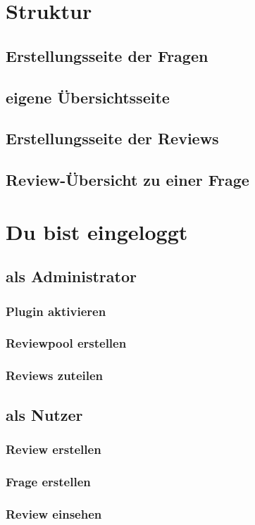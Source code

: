 \documentclass[12pt,a4paper]{scrreprt}
\begin{document}
\chapter{Struktur}
\section{Erstellungsseite der Fragen}
\section{eigene \"Ubersichtsseite}	
\section{Erstellungsseite der Reviews}
\section{Review-\"Ubersicht zu einer Frage}


\chapter{Du bist eingeloggt}
	\section{als Administrator}
		\subsection{Plugin aktivieren}		
		\subsection{Reviewpool erstellen}
		\subsection{Reviews zuteilen}
	\section{als Nutzer}
		\subsection{Review erstellen}
		\subsection{Frage erstellen}
		\subsection{Review einsehen}
		
\end{document}

